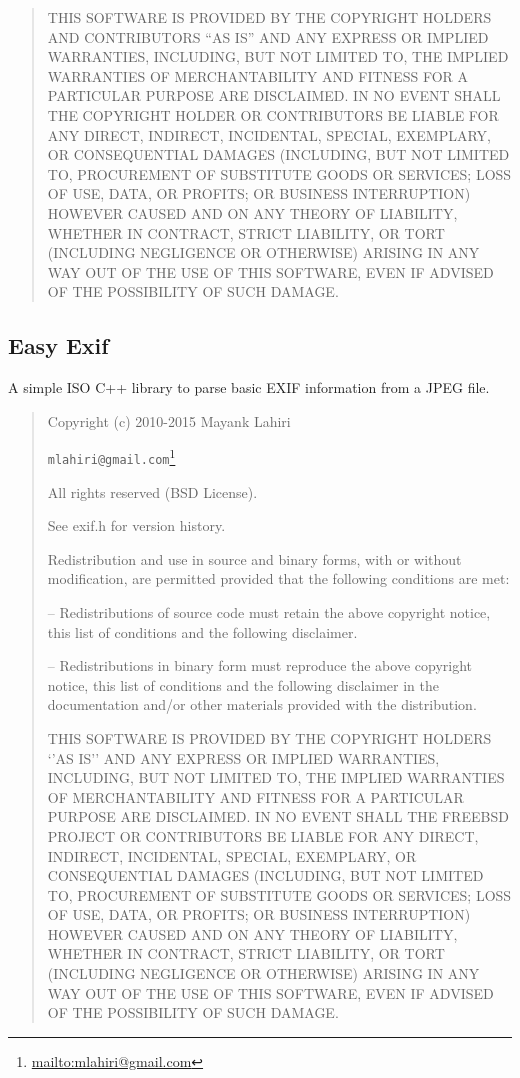 \documentclass[
]{book}
\DeclareRobustCommand{\href}[2]{#2\footnote{\url{#1}}}
\theoremstyle{definition}
\theoremstyle{definition}
\theoremstyle{definition}
\theoremstyle{definition}
\theoremstyle{remark}
\begin{document}
\begin{quote}
THIS SOFTWARE IS PROVIDED BY THE COPYRIGHT HOLDERS AND CONTRIBUTORS ``AS IS''
AND ANY EXPRESS OR IMPLIED WARRANTIES, INCLUDING, BUT NOT LIMITED TO, THE
IMPLIED WARRANTIES OF MERCHANTABILITY AND FITNESS FOR A PARTICULAR PURPOSE ARE
DISCLAIMED. IN NO EVENT SHALL THE COPYRIGHT HOLDER OR CONTRIBUTORS BE LIABLE
FOR ANY DIRECT, INDIRECT, INCIDENTAL, SPECIAL, EXEMPLARY, OR CONSEQUENTIAL
DAMAGES (INCLUDING, BUT NOT LIMITED TO, PROCUREMENT OF SUBSTITUTE GOODS OR
SERVICES; LOSS OF USE, DATA, OR PROFITS; OR BUSINESS INTERRUPTION) HOWEVER
CAUSED AND ON ANY THEORY OF LIABILITY, WHETHER IN CONTRACT, STRICT LIABILITY,
OR TORT (INCLUDING NEGLIGENCE OR OTHERWISE) ARISING IN ANY WAY OUT OF THE USE
OF THIS SOFTWARE, EVEN IF ADVISED OF THE POSSIBILITY OF SUCH DAMAGE.
\end{quote}

\hypertarget{easy-exif}{%
\subsection*{Easy Exif}\label{easy-exif}}

A simple ISO C++ library to parse basic EXIF information from a JPEG file.

\begin{quote}
Copyright (c) 2010-2015 Mayank Lahiri

\href{mailto:mlahiri@gmail.com}{\nolinkurl{mlahiri@gmail.com}}

All rights reserved (BSD License).

See exif.h for version history.

Redistribution and use in source and binary forms, with or without
modification, are permitted provided that the following conditions are met:

-- Redistributions of source code must retain the above copyright notice,
this list of conditions and the following disclaimer.

-- Redistributions in binary form must reproduce the above copyright notice,
this list of conditions and the following disclaimer in the documentation
and/or other materials provided with the distribution.

THIS SOFTWARE IS PROVIDED BY THE COPYRIGHT HOLDERS `'AS IS'' AND ANY EXPRESS
OR IMPLIED WARRANTIES, INCLUDING, BUT NOT LIMITED TO, THE IMPLIED WARRANTIES
OF MERCHANTABILITY AND FITNESS FOR A PARTICULAR PURPOSE ARE DISCLAIMED. IN
NO EVENT SHALL THE FREEBSD PROJECT OR CONTRIBUTORS BE LIABLE FOR ANY DIRECT,
INDIRECT, INCIDENTAL, SPECIAL, EXEMPLARY, OR CONSEQUENTIAL DAMAGES (INCLUDING,
BUT NOT LIMITED TO, PROCUREMENT OF SUBSTITUTE GOODS OR SERVICES; LOSS OF USE,
DATA, OR PROFITS; OR BUSINESS INTERRUPTION) HOWEVER CAUSED AND ON ANY THEORY
OF LIABILITY, WHETHER IN CONTRACT, STRICT LIABILITY, OR TORT (INCLUDING
NEGLIGENCE OR OTHERWISE) ARISING IN ANY WAY OUT OF THE USE OF THIS SOFTWARE,
EVEN IF ADVISED OF THE POSSIBILITY OF SUCH DAMAGE.
\end{quote}
\end{document}
